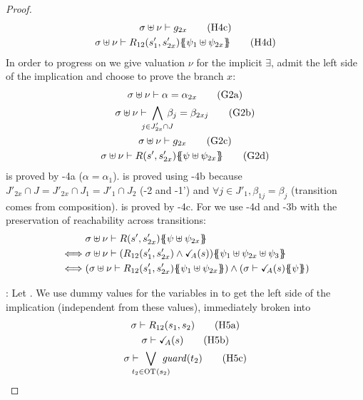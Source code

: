 \documentclass{article}
\begin{document}
\begin{proof}
\begin{gather}
		\sigma \uplus \nu \vdash g_{2x} \hyp{4c} \\
		\sigma \uplus \nu \vdash R_{12}\mpar{s'_1, s'_{2x}}\psubst{\psi_1 \uplus \psi_{2x}} \hyp{4d}
	\end{gather}
	In order to progress on  we give valuation \(\nu\) for the implicit \(\exists\), admit the left side of the implication and choose to prove the branch \(x\):
	\begin{gather}
		\sigma \uplus \nu \vdash \alpha = \alpha_{2x} \goal{2a} \\
		\sigma \uplus \nu \vdash \bigwedge_\subbox{j \in J'_{2x} \cap J} \beta_j = \beta_{2xj} \goal{2b} \\
		\sigma \uplus \nu \vdash g_{2x} \goal{2c} \\
		\sigma \uplus \nu \vdash R\mpar{s', s'_{2x}}\psubst{\psi \uplus \psi_{2x}} \goal{2d}
	\end{gather}
	 is proved by \hyp{4a} (\(\alpha = \alpha_1\)).
	 is proved using \hyp{4b} because \(J'_{2x} \cap J = J'_{2x} \cap J_1 = J'_1 \cap J_2\) (\hyp{2} and \hyp{1'}) and \(\forall j \in J'_1, \beta_{1j} = \beta_j\) (transition comes from composition).
	 is proved by \hyp{4c}.
	For  we use \hyp{4d} and \hyp{3b} with the preservation of reachability across transitions:
	\begin{align*}
		& \sigma \uplus \nu \vdash R\mpar{s', s'_{2x}}\psubst{\psi \uplus \psi_{2x}} \\
		\iff & \sigma \uplus \nu \vdash \mpar{R_{12}\mpar{s'_1, s'_{2x}} \wedge \reach{A}\mpar{s}}\psubst{\psi_1 \uplus \psi_{2x} \uplus \psi_3} \\
		\iff & \mpar{\sigma \uplus \nu \vdash R_{12}\mpar{s'_1, s'_{2x}}\psubst{\psi_1 \uplus \psi_{2x}}} \wedge \mpar{\sigma \vdash \reach{A}\mpar{s}\psubst{\psi}}
	\end{align*}
\item[\goal{1}:]
	Let .
	We use dummy values for the variables in  to get the left side of the implication (independent from these values), immediately broken into
	\begin{gather}
		\sigma \vdash R_{12}\mpar{s_1, s_2} \hyp{5a} \\
		\sigma \vdash \reach{A}\mpar{s} \hyp{5b} \\
		\sigma \vdash \bigvee_\subbox{t_2 \in \fOT{s_2}} \fguard{t_2} \hyp{5c}
	\end{gather}

\end{proof}
\end{document}
